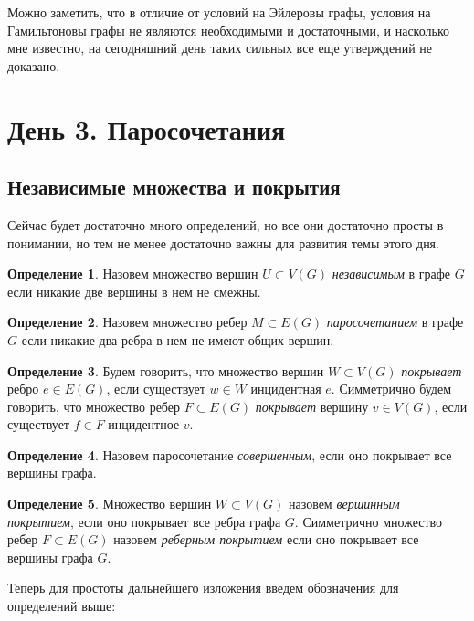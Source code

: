 \documentclass{article}
\theoremstyle{definition}
\newtheorem{definition}{Определение}[section]
\theoremstyle{remark}
\begin{document}
Можно заметить, что в отличие от условий на Эйлеровы графы, условия на Гамильтоновы графы не являются необходимыми и достаточными, и насколько мне известно, на сегодняшний день таких сильных все еще утверждений не доказано.

\section{День 3. Паросочетания}

\subsection{Независимые множества и покрытия}

Сейчас будет достаточно много определений, но все они достаточно просты в понимании, но тем не менее достаточно важны для развития темы этого дня.

\begin{definition}
    Назовем множество вершин $U \subset V(G)$ \textit{независимым} в графе $G$ если никакие две вершины в нем не смежны.
\end{definition}

\begin{definition}
    Назовем множество ребер $M \subset E(G)$ \textit{паросочетанием} в графе $G$ если никакие два ребра в нем не имеют общих вершин.
\end{definition}

\begin{definition}
    Будем говорить, что множество вершин $W \subset V(G)$ \textit{покрывает} ребро $e \in E(G)$, если существует $w \in W$ инцидентная $e$. Симметрично будем говорить, что множество ребер $F \subset E(G)$ \textit{покрывает} вершину $v \in V(G)$, если существует $f \in F$ инцидентное $v$.
\end{definition}

\begin{definition}
    Назовем паросочетание \textit{совершенным}, если оно покрывает все вершины графа.
\end{definition}

\begin{definition}
    Множество вершин $W \subset V(G)$ назовем \textit{вершинным покрытием}, если оно покрывает все ребра графа $G$. Симметрично множество ребер $F \subset E(G) $ назовем \textit{реберным покрытием} если оно покрывает все вершины графа $G$.
\end{definition}

    Теперь для простоты дальнейшего изложения введем обозначения для определений выше: 
    
\end{document}
